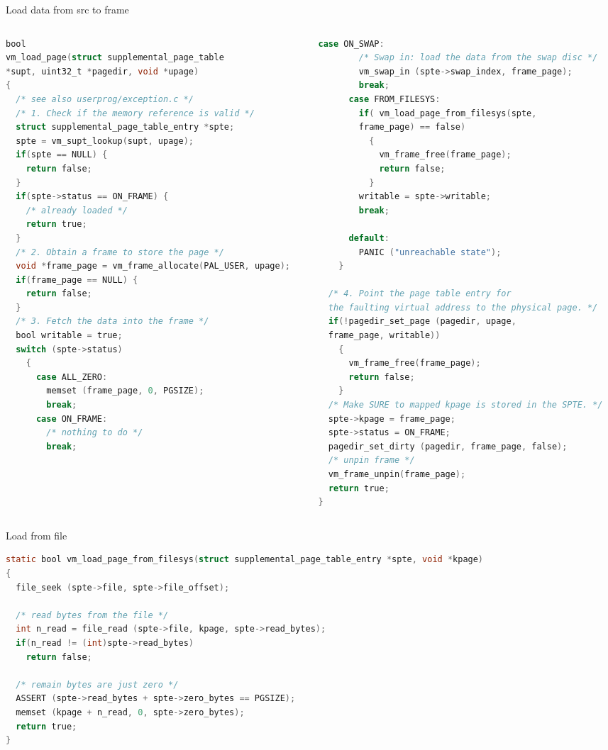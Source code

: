 \documentclass[10pt]{beamer}
\begin{document}
\begin{frame}[fragile]{Load data from src to frame}
\begin{columns}
\begin{column}{0.5\textwidth}
\begin{lstlisting}[language=C]
bool
vm_load_page(struct supplemental_page_table 
*supt, uint32_t *pagedir, void *upage)
{
  /* see also userprog/exception.c */
  /* 1. Check if the memory reference is valid */
  struct supplemental_page_table_entry *spte;
  spte = vm_supt_lookup(supt, upage);
  if(spte == NULL) {
    return false;
  }
  if(spte->status == ON_FRAME) {
    /* already loaded */
    return true;
  }
  /* 2. Obtain a frame to store the page */
  void *frame_page = vm_frame_allocate(PAL_USER, upage);
  if(frame_page == NULL) {
    return false;
  }
  /* 3. Fetch the data into the frame */
  bool writable = true;
  switch (spte->status)
    {
      case ALL_ZERO:
        memset (frame_page, 0, PGSIZE);
        break;
      case ON_FRAME:
        /* nothing to do */
        break;
\end{lstlisting}
\end{column}
\begin{column}{0.5\textwidth}
\begin{lstlisting}[language=C]
      case ON_SWAP:
        /* Swap in: load the data from the swap disc */
        vm_swap_in (spte->swap_index, frame_page);
        break;
      case FROM_FILESYS:
        if( vm_load_page_from_filesys(spte, 
        frame_page) == false) 
          {
            vm_frame_free(frame_page);
            return false;
          }
        writable = spte->writable;
        break;

      default:
        PANIC ("unreachable state");
    }

  /* 4. Point the page table entry for 
  the faulting virtual address to the physical page. */
  if(!pagedir_set_page (pagedir, upage,
  frame_page, writable)) 
    {
      vm_frame_free(frame_page);
      return false;
    }
  /* Make SURE to mapped kpage is stored in the SPTE. */
  spte->kpage = frame_page;
  spte->status = ON_FRAME;
  pagedir_set_dirty (pagedir, frame_page, false);
  /* unpin frame */
  vm_frame_unpin(frame_page);
  return true;
}
\end{lstlisting}
\end{column}
\end{columns}
\end{frame}
\begin{frame}[fragile]{Load from file}
\begin{lstlisting}[language=C]
static bool vm_load_page_from_filesys(struct supplemental_page_table_entry *spte, void *kpage)
{
  file_seek (spte->file, spte->file_offset);

  /* read bytes from the file */
  int n_read = file_read (spte->file, kpage, spte->read_bytes);
  if(n_read != (int)spte->read_bytes)
    return false;

  /* remain bytes are just zero */
  ASSERT (spte->read_bytes + spte->zero_bytes == PGSIZE);
  memset (kpage + n_read, 0, spte->zero_bytes);
  return true;
}
\end{lstlisting}
\end{frame}
\end{document}
